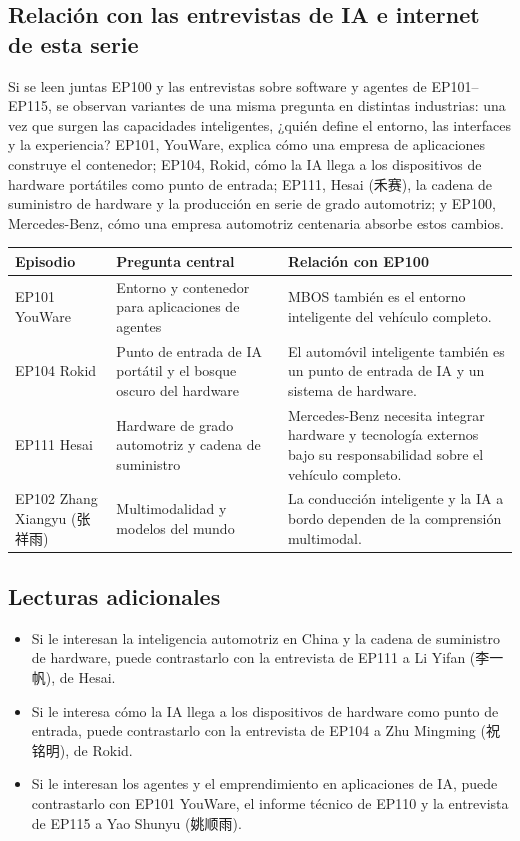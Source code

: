 \documentclass[a4paper]{article}
\begin{document}
\subsection{Relación con las entrevistas de IA e internet de esta serie}

Si se leen juntas EP100 y las entrevistas sobre software y agentes de EP101--EP115, se observan variantes de una misma pregunta en distintas industrias: una vez que surgen las capacidades inteligentes, ¿quién define el entorno, las interfaces y la experiencia? EP101, YouWare, explica cómo una empresa de aplicaciones construye el contenedor; EP104, Rokid, cómo la IA llega a los dispositivos de hardware portátiles como punto de entrada; EP111, Hesai (禾赛), la cadena de suministro de hardware y la producción en serie de grado automotriz; y EP100, Mercedes-Benz, cómo una empresa automotriz centenaria absorbe estos cambios.

\noindent\begin{tabularx}{\textwidth}{p{}p{}X}
\toprule
Episodio & Pregunta central & Relación con EP100 \\
\midrule
EP101 YouWare & Entorno y contenedor para aplicaciones de agentes & MBOS también es el entorno inteligente del vehículo completo. \\
EP104 Rokid & Punto de entrada de IA portátil y el bosque oscuro del hardware & El automóvil inteligente también es un punto de entrada de IA y un sistema de hardware. \\
EP111 Hesai & Hardware de grado automotriz y cadena de suministro & Mercedes-Benz necesita integrar hardware y tecnología externos bajo su responsabilidad sobre el vehículo completo. \\
EP102 Zhang Xiangyu (张祥雨) & Multimodalidad y modelos del mundo & La conducción inteligente y la IA a bordo dependen de la comprensión multimodal. \\
\bottomrule
\end{tabularx}

\subsection{Lecturas adicionales}

\begin{itemize}
\item Si le interesan la inteligencia automotriz en China y la cadena de suministro de hardware, puede contrastarlo con la entrevista de EP111 a Li Yifan (李一帆), de Hesai.
\item Si le interesa cómo la IA llega a los dispositivos de hardware como punto de entrada, puede contrastarlo con la entrevista de EP104 a Zhu Mingming (祝铭明), de Rokid.
\item Si le interesan los agentes y el emprendimiento en aplicaciones de IA, puede contrastarlo con EP101 YouWare, el informe técnico de EP110 y la entrevista de EP115 a Yao Shunyu (姚顺雨).
\end{itemize}
\end{document}
